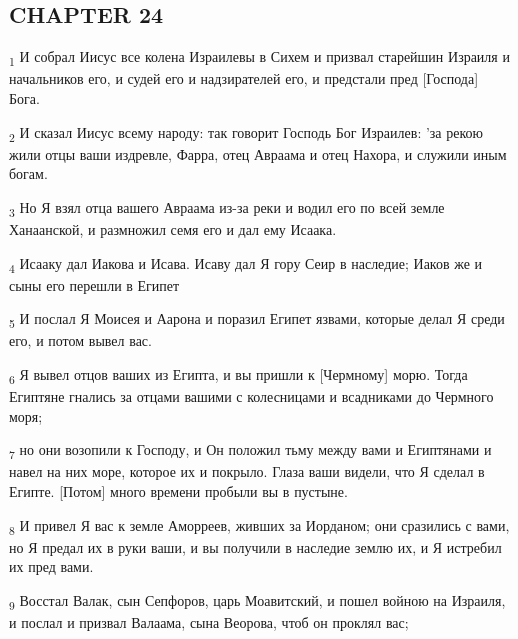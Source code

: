 \subsection{CHAPTER 24}
\begin{tcolorbox}
\textsubscript{1} И собрал Иисус все колена Израилевы в Сихем и призвал старейшин Израиля и начальников его, и судей его и надзирателей его, и предстали пред [Господа] Бога.
\end{tcolorbox}
\begin{tcolorbox}
\textsubscript{2} И сказал Иисус всему народу: так говорит Господь Бог Израилев: 'за рекою жили отцы ваши издревле, Фарра, отец Авраама и отец Нахора, и служили иным богам.
\end{tcolorbox}
\begin{tcolorbox}
\textsubscript{3} Но Я взял отца вашего Авраама из-за реки и водил его по всей земле Ханаанской, и размножил семя его и дал ему Исаака.
\end{tcolorbox}
\begin{tcolorbox}
\textsubscript{4} Исааку дал Иакова и Исава. Исаву дал Я гору Сеир в наследие; Иаков же и сыны его перешли в Египет
\end{tcolorbox}
\begin{tcolorbox}
\textsubscript{5} И послал Я Моисея и Аарона и поразил Египет язвами, которые делал Я среди его, и потом вывел вас.
\end{tcolorbox}
\begin{tcolorbox}
\textsubscript{6} Я вывел отцов ваших из Египта, и вы пришли к [Чермному] морю. Тогда Египтяне гнались за отцами вашими с колесницами и всадниками до Чермного моря;
\end{tcolorbox}
\begin{tcolorbox}
\textsubscript{7} но они возопили к Господу, и Он положил тьму между вами и Египтянами и навел на них море, которое их и покрыло. Глаза ваши видели, что Я сделал в Египте. [Потом] много времени пробыли вы в пустыне.
\end{tcolorbox}
\begin{tcolorbox}
\textsubscript{8} И привел Я вас к земле Аморреев, живших за Иорданом; они сразились с вами, но Я предал их в руки ваши, и вы получили в наследие землю их, и Я истребил их пред вами.
\end{tcolorbox}
\begin{tcolorbox}
\textsubscript{9} Восстал Валак, сын Сепфоров, царь Моавитский, и пошел войною на Израиля, и послал и призвал Валаама, сына Веорова, чтоб он проклял вас;
\end{tcolorbox}

